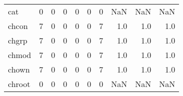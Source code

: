 \begin{longtable}{lrrrrrrrrr}
cat       &                                                  0 &                                                  0 &                                                  0 &                                                  0 &                                                  0 &                                                  0 &                                                NaN &                                    NaN &                                  NaN \\
chcon     &                                                  7 &                                                  0 &                                                  0 &                                                  0 &                                                  0 &                                                  7 &                                                1.0 &                                    1.0 &                                  1.0 \\
chgrp     &                                                  7 &                                                  0 &                                                  0 &                                                  0 &                                                  0 &                                                  7 &                                                1.0 &                                    1.0 &                                  1.0 \\
chmod     &                                                  7 &                                                  0 &                                                  0 &                                                  0 &                                                  0 &                                                  7 &                                                1.0 &                                    1.0 &                                  1.0 \\
chown     &                                                  7 &                                                  0 &                                                  0 &                                                  0 &                                                  0 &                                                  7 &                                                1.0 &                                    1.0 &                                  1.0 \\
chroot    &                                                  0 &                                                  0 &                                                  0 &                                                  0 &                                                  0 &                                                  0 &                                                NaN &                                    NaN &                                  NaN \\

\end{longtable}
